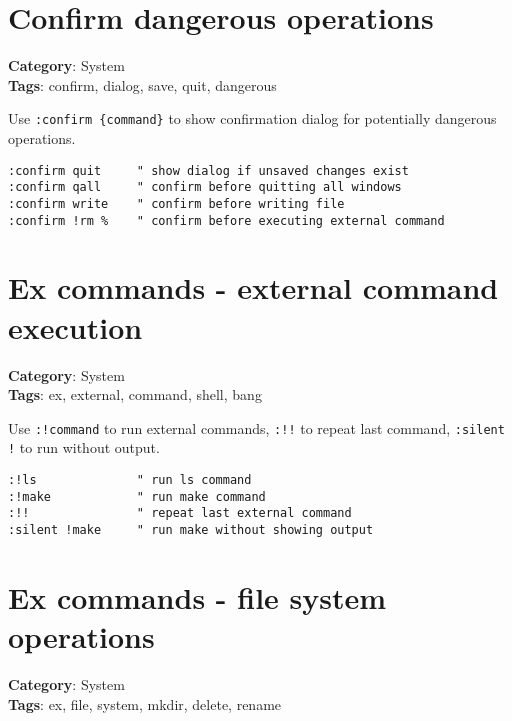 {{{{{{{{{{{{{{\section{Confirm dangerous operations}

\textbf{Category}: System\\ \textbf{Tags}: confirm, dialog, save, quit, dangerous
\vspace{0.5cm}

Use {\footnotesize \Verb§:confirm {command}§} to show confirmation dialog for potentially dangerous operations.

\begin{Exa*}{}
\begin{Verbatim}[fontsize=\footnotesize, breaklines, breakanywhere]
:confirm quit     " show dialog if unsaved changes exist
:confirm qall     " confirm before quitting all windows
:confirm write    " confirm before writing file
:confirm !rm %    " confirm before executing external command
\end{Verbatim}
\end{Exa*}

\section{Ex commands - external command execution}

\textbf{Category}: System\\ \textbf{Tags}: ex, external, command, shell, bang
\vspace{0.5cm}

Use {\footnotesize \Verb§:!command§} to run external commands, {\footnotesize \Verb§:!!§} to repeat last command, {\footnotesize \Verb§:silent !§} to run without output.

\begin{Exa*}{}
\begin{Verbatim}[fontsize=\footnotesize, breaklines, breakanywhere]
:!ls              " run ls command
:!make            " run make command
:!!               " repeat last external command
:silent !make     " run make without showing output
\end{Verbatim}
\end{Exa*}

\section{Ex commands - file system operations}

\textbf{Category}: System\\ \textbf{Tags}: ex, file, system, mkdir, delete, rename
\vspace{0.5cm}

}}}}}}}}}}}}}}
